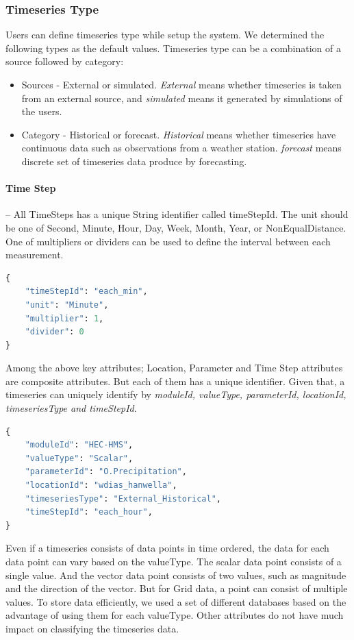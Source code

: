 \subsubsection{Timeseries Type}
Users can define timeseries type while setup the system. We determined the following types as the default values. Timeseries type can be a combination of a source followed by category:
\begin{itemize}
  \item Sources - External or simulated. \emph{External} means whether timeseries is taken from an external source, and \emph{simulated} means it generated by simulations of the users.
  \item Category - Historical or forecast. \emph{Historical} means whether timeseries have continuous data such as observations from a weather station. \emph{forecast} means discrete set of timeseries data produce by forecasting.
\end{itemize}

\paragraph{Time Step}-- All TimeSteps has a unique String identifier called timeStepId. The unit should be one of Second, Minute, Hour, Day, Week, Month, Year, or NonEqualDistance. One of multipliers or dividers can be used to define the interval between each measurement.
\begin{lstlisting}[language=Python]
{
    "timeStepId": "each_min",
    "unit": "Minute",
    "multiplier": 1,
    "divider": 0
}
\end{lstlisting}

Among the above key attributes; Location, Parameter and Time Step attributes are composite attributes. But each of them has a unique identifier.
Given that, a timeseries can uniquely identify by \emph{moduleId, valueType, parameterId, locationId, timeseriesType and timeStepId}.
\begin{lstlisting}[language=Python]
{
	"moduleId": "HEC-HMS",
	"valueType": "Scalar",
	"parameterId": "O.Precipitation",
	"locationId": "wdias_hanwella",
	"timeseriesType": "External_Historical",
	"timeStepId": "each_hour",
}
\end{lstlisting}

Even if a timeseries consists of data points in time ordered, the data for each data point can vary based on the valueType. The scalar data point consists of a single value. And the vector data point consists of two values, such as magnitude and the direction of the vector. But for Grid data, a point can consist of multiple values. To store data efficiently, we used a set of different databases based on the advantage of using them for each valueType. Other attributes do not have much impact on classifying the timeseries data.

